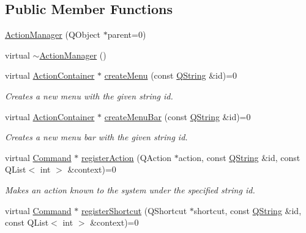 \subsection*{\-Public \-Member \-Functions}
\begin{DoxyCompactItemize}
\item 
\hyperlink{group___core_plugin_gab0f34dc9c6d367a0807cef1003bc3667}{\-Action\-Manager} (\-Q\-Object $\ast$parent=0)
\item 
virtual \hyperlink{group___core_plugin_gac80d3d645622551a98db65a649abe079}{$\sim$\-Action\-Manager} ()
\item 
virtual \hyperlink{class_core_1_1_action_container}{\-Action\-Container} $\ast$ \hyperlink{group___core_plugin_ga5affc8a59dfae8d4d00779b9f8390c22}{create\-Menu} (const \hyperlink{group___u_a_v_objects_plugin_gab9d252f49c333c94a72f97ce3105a32d}{\-Q\-String} \&id)=0
\begin{DoxyCompactList}\small\item\em \-Creates a new menu with the given string {\itshape id\/}. \end{DoxyCompactList}\item 
virtual \hyperlink{class_core_1_1_action_container}{\-Action\-Container} $\ast$ \hyperlink{group___core_plugin_gaa00e94317a705be8cf40afc32368c4b4}{create\-Menu\-Bar} (const \hyperlink{group___u_a_v_objects_plugin_gab9d252f49c333c94a72f97ce3105a32d}{\-Q\-String} \&id)=0
\begin{DoxyCompactList}\small\item\em \-Creates a new menu bar with the given string {\itshape id\/}. \end{DoxyCompactList}\item 
virtual \hyperlink{class_core_1_1_command}{\-Command} $\ast$ \hyperlink{group___core_plugin_ga316dd0cff29b294cd1b0631677f6357d}{register\-Action} (\-Q\-Action $\ast$action, const \hyperlink{group___u_a_v_objects_plugin_gab9d252f49c333c94a72f97ce3105a32d}{\-Q\-String} \&id, const \-Q\-List$<$ int $>$ \&context)=0
\begin{DoxyCompactList}\small\item\em \-Makes an {\itshape action\/} known to the system under the specified string {\itshape id\/}. \end{DoxyCompactList}\item 
virtual \hyperlink{class_core_1_1_command}{\-Command} $\ast$ \hyperlink{group___core_plugin_ga74e32e1f8008da2d536cc688b32d111f}{register\-Shortcut} (\-Q\-Shortcut $\ast$shortcut, const \hyperlink{group___u_a_v_objects_plugin_gab9d252f49c333c94a72f97ce3105a32d}{\-Q\-String} \&id, const \-Q\-List$<$ int $>$ \&context)=0

\end{DoxyCompactItemize}
